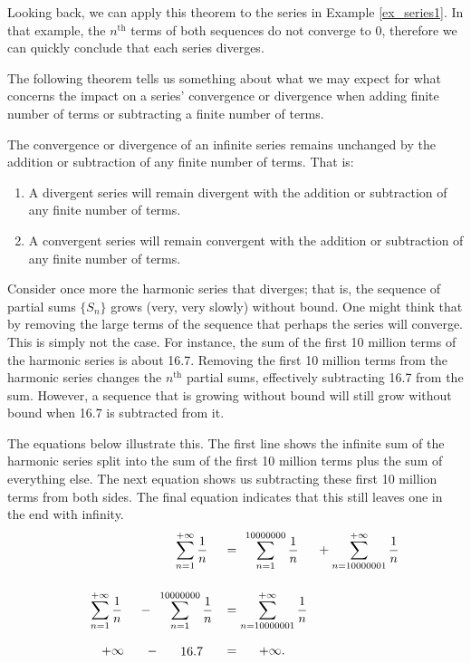 
Looking back, we can apply this theorem to the series in Example \ref{ex_series1}. In that example, the $n^\text{th}$ terms of both sequences do not converge to 0, therefore we can quickly conclude that each series diverges.

The following theorem tells us something about what we may expect for what concerns the impact on a series' convergence or divergence when adding finite number of terms or subtracting a finite number of terms. 

\begin{theorem}\label{thm:series_behavior}
The convergence or divergence of an infinite series remains unchanged by the addition or subtraction of any finite number of terms. That is:
	\begin{enumerate}
	\item		A divergent series will remain divergent with the addition or subtraction of any finite number of terms.
	\item		A convergent series will remain convergent with the addition or subtraction of any finite number of terms.
	\end{enumerate}
\end{theorem}


Consider once more the harmonic series that diverges; that is, the sequence of partial sums $\{S_n\}$ grows (very, very slowly) without bound. One might think that by removing the large terms of the sequence that perhaps the series will converge. This is simply not the case. For instance, the sum of the first 10 million terms of the harmonic series is about 16.7. Removing the first 10 million terms from the harmonic series changes the $n^\text{th}$ partial sums,  effectively subtracting 16.7 from the sum. However, a sequence that is growing without bound will still grow without bound when 16.7 is subtracted from it. 

The equations below illustrate this. The first line shows the infinite sum of the harmonic series split into the sum of the first 10 million terms plus the sum of everything else. The next equation shows us subtracting these first 10 million terms from both sides. The final equation indicates that this still leaves one in the end with infinity.
\begin{align*}
 \parbox{50pt}{\centering$\ds\sum_{n=1}^{+\infty} \frac1n$} &= \parbox{50pt}{\centering$\ds\sum_{n=1}^{10000000}\frac1n$}\quad + \parbox{50pt}{\centering$\ds\sum_{n=10000001}^{+\infty} \frac1n$} \rule[-20pt]{0pt}{1pt} \\[0.2cm]
 \parbox{50pt}{\centering$\ds\sum_{n=1}^{+\infty} \frac1n$} - \parbox{55pt}{\centering$\ds\sum_{n=1}^{10000000}\frac1n \,\,$}&= \parbox{50pt}{\centering$\ds\sum_{n=10000001}^{+\infty} \frac1n$} \rule[-20pt]{0pt}{1pt}\\
\parbox{50pt}{\centering	$+\infty$} - \parbox{50pt}{\centering $16.7$} &=  \parbox{50pt}{\centering$+\infty.$}
\end{align*}				

